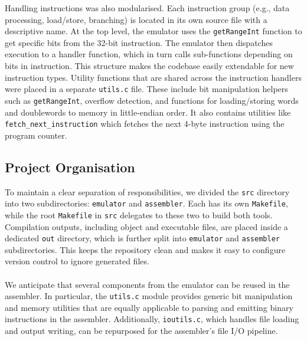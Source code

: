 \documentclass[11pt]{article}
\begin{document}
Handling instructions was also modularised. Each instruction group (e.g., data processing, load/store, branching) is located in its own source file with a descriptive name. At the top level, the emulator uses the \texttt{getRangeInt} function to get specific bits from the 32-bit instruction.  The emulator then dispatches execution to a handler function, which in turn calls sub-functions depending on bits in instruction. This structure makes the codebase easily extendable for new instruction types. Utility functions that are shared across the instruction handlers were placed in a separate \texttt{utils.c} file. These include bit manipulation helpers such as \texttt{getRangeInt}, overflow detection, and functions for loading/storing words and doublewords to memory in little-endian order. It also contains utilities like \texttt{fetch\_next\_instruction} which fetches the next 4-byte instruction using the program counter.

\subsection{Project Organisation}
\noindent
\begin{minipage}[t]{0.44\textwidth}
\vspace*{0pt}
\begin{tcolorbox}[title=Directory Tree, colback=white, colframe=black!75!black, boxsep=2pt, left=2pt, right=2pt, top=2pt, bottom=2pt]
\scriptsize
{}
\end{tcolorbox}
\end{minipage}
\hfill
\begin{minipage}[t]{0.53\textwidth}
\vspace*{0pt}
To maintain a clear separation of responsibilities, we divided the \texttt{src} directory into two subdirectories: \texttt{emulator} and \texttt{assembler}. Each has its own \texttt{Makefile}, while the root \texttt{Makefile} in \texttt{src} delegates to these two to build both tools. Compilation outputs, including object and executable files, are placed inside a dedicated \texttt{out} directory, which is further split into \texttt{emulator} and \texttt{assembler} subdirectories. This keeps the repository clean and makes it easy to configure version control to ignore generated files.
\\ 
\\
We anticipate that several components from the emulator can be reused in the assembler. In particular, the \texttt{utils.c} module provides generic bit manipulation and memory utilities that are equally applicable to parsing and emitting binary instructions in the assembler. Additionally, \texttt{ioutils.c}, which handles file loading and output writing, can be repurposed for the assembler's file I/O pipeline.

\end{minipage}
\end{document}
